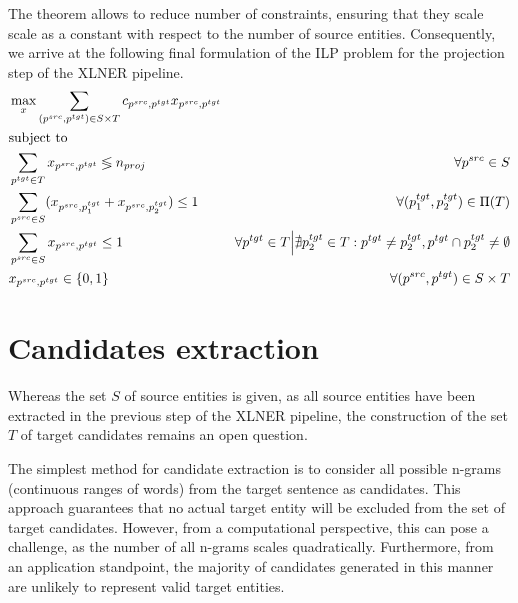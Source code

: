 The theorem allows to reduce number of constraints, ensuring that they scale scale as a constant
with respect to the number of source entities. Consequently, we arrive at the following final
formulation of the ILP problem for the projection step of the XLNER pipeline.
\begin{equation} \label{eq:ilp}
  \begin{aligned}
    & \max\limits_x \sum\limits_{(p^{src}, p^{tgt}) \in S \times T} c_{p^{src}, p^{tgt}} x_{p^{src}, p^{tgt}}                                                                                                                       \\
    & \text{subject to}                                                                                                                                                                                                             \\
    & \sum\limits_{p^{tgt} \in T} x_{p^{src}, p^{tgt}} \lessgtr n_{proj}                                      & \forall p^{src} \in S                                                                                               \\
    & \sum\limits_{p^{src} \in S} (x_{p^{src}, p_1^{tgt}} + x_{p^{src}, p_2^{tgt}}) \leq 1                    & \forall (p_1^{tgt}, p_2^{tgt}) \in \Pi(T)                                                                           \\
    & \sum\limits_{p^{src} \in S} x_{p^{src}, p^{tgt}} \leq 1                                                 & \forall p^{tgt} \in T \Big| \nexists p_2^{tgt} \in T: p^{tgt} \neq p_2^{tgt}, p^{tgt} \cap p_2^{tgt} \neq \emptyset \\
    & x_{p^{src}, p^{tgt}} \in \{ 0, 1 \}                                                                     & \forall (p^{src}, p^{tgt}) \in S \times T
  \end{aligned}
\end{equation}

\section{Candidates extraction}
Whereas the set \( S \) of source entities is given, as all source entities have been
extracted in the previous step of the XLNER pipeline, the construction of the set
\( T \) of target candidates remains an open question.

The simplest method for candidate extraction is to consider all possible n-grams
(continuous ranges of words) from the target sentence as candidates. This approach
guarantees that no actual target entity will be excluded from the set of target
candidates. However, from a computational perspective, this can pose a challenge,
as the number of all n-grams scales quadratically. Furthermore, from an application
standpoint, the majority of candidates generated in this manner are unlikely to
represent valid target entities.

